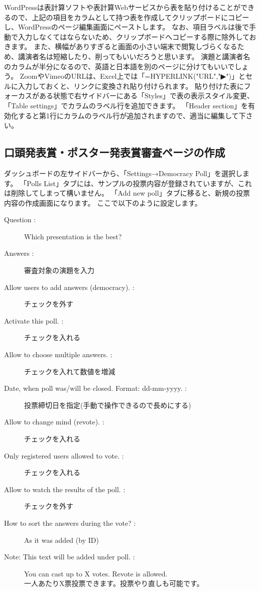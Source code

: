 \documentclass[titlepage,10pt,a4paper,uplatex]{jsbook}
\begin{document}
WordPressは表計算ソフトや表計算Webサービスから表を貼り付けることができるので、上記の項目をカラムとして持つ表を作成してクリップボードにコピーし、WordPressのページ編集画面にペーストします。
なお、項目ラベルは後で手動で入力しなくてはならないため、クリップボードへコピーする際に除外しておきます。
また、横幅がありすぎると画面の小さい端末で閲覧しづらくなるため、講演者名は短縮したり、削ってもいいだろうと思います。
演題と講演者名のカラムが半分になるので、英語と日本語を別のページに分けてもいいでしょう。
ZoomやVimeoのURLは、Excel上では「=HYPERLINK("URL","▶")」とセルに入力しておくと、リンクに変換され貼り付けられます。
貼り付けた表にフォーカスがある状態で右サイドバーにある「Styles」で表の表示スタイル変更、「Table settings」でカラムのラベル行を追加できます。
「Header section」を有効化すると第1行にカラムのラベル行が追加されますので、適当に編集して下さい。

\subsection{口頭発表賞・ポスター発表賞審査ページの作成}

ダッシュボードの左サイドバーから、「Settings→Democracy Poll」を選択します。
「Polls List」タブには、サンプルの投票内容が登録されていますが、これは削除してしまって構いません。
「Add new poll」タブに移ると、新規の投票内容の作成画面になります。
ここで以下のように設定します。

\begin{description}
\item[Question : ] Which presentation is the best?
\item[Answers : ] 審査対象の演題を入力
\item[Allow users to add answers (democracy). : ] チェックを外す
\item[Activate this poll. : ] チェックを入れる
\item[Allow to choose multiple answers. : ] チェックを入れて数値を増減
\item[Date, when poll was/will be closed. Format: dd-mm-yyyy. : ] 投票締切日を指定(手動で操作できるので長めにする)
\item[Allow to change mind (revote). : ] チェックを入れる
\item[Only registered users allowed to vote. : ] チェックを入れる
\item[Allow to watch the results of the poll. : ] チェックを外す
\item[How to sort the answers during the vote? : ] As it was added (by ID)
\item[Note: This text will be added under poll. : ] You can cast up to X votes. Revote is allowed.\\一人あたりX票投票できます。投票やり直しも可能です。
\end{description}
\end{document}
